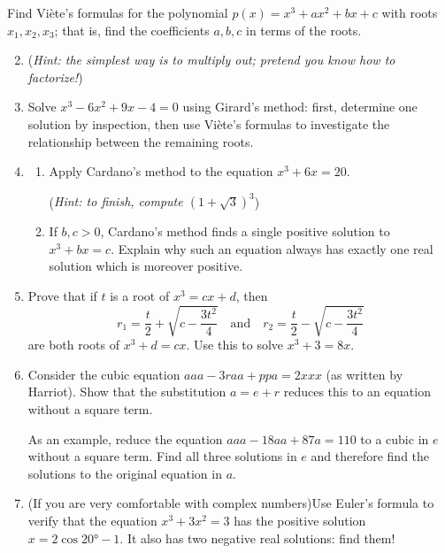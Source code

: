 \begin{exercises}{}{}
	\exstart Find Viète's formulas for the polynomial $p(x)=x^3+ax^2+bx+c$ with roots $x_1,x_2,x_3$; that is, find the coefficients $a,b,c$ in terms of the roots.\vspace{-10pt}
	
	\begin{enumerate}\setcounter{enumi}{1}
	  \item[](\emph{Hint: the simplest way is to multiply out; pretend you know how to factorize!})
		\item%
	  Solve $x^3-6x^2+9x-4=0$ using Girard's method: first, determine one solution by inspection, then use Viète's formulas to investigate the relationship between the remaining roots.
			
		\item\begin{enumerate}
		  \item Apply Cardano's method to the equation $x^3+6x=20$.\par
		  (\emph{Hint: to finish, compute $(1+\sqrt 3)^3$})
			\item If $b,c>0$, Cardano's method finds a single positive solution to $x^3+bx=c$. Explain why such an equation always has exactly one real solution which is moreover positive.
		\end{enumerate}
		
		\item%
		Prove that if $t$ is a root of $x^3=cx+d$, then
		\[
			r_1=\frac t2+\sqrt{c-\frac{3t^2}4}
			\quad\text{and}\quad 
			r_2=\frac t2-\sqrt{c-\frac{3t^2}4}
		\]
		are both roots of $x^3+d=cx$. Use this to solve $x^3+3=8x$.
		
	
		\item%
		Consider the cubic equation $aaa-3raa+ppa=2xxx$ (as written by Harriot). Show that the substitution $a=e+r$ reduces this to an equation without a square term.\par
		As an example, reduce the equation $aaa-18aa+87a=110$ to a cubic in $e$ without a square term. Find all three solutions in $e$ and therefore find the solutions to the original equation in $a$.
	  
		
		\item (If you are very comfortable with complex numbers)\lstsp Use Euler's formula to verify that the equation $x^3+3x^2=3$ has the positive solution $x=2\cos\ang{20}-1$. It also has two negative real solutions: find them! 
	\end{enumerate}
\end{exercises}

